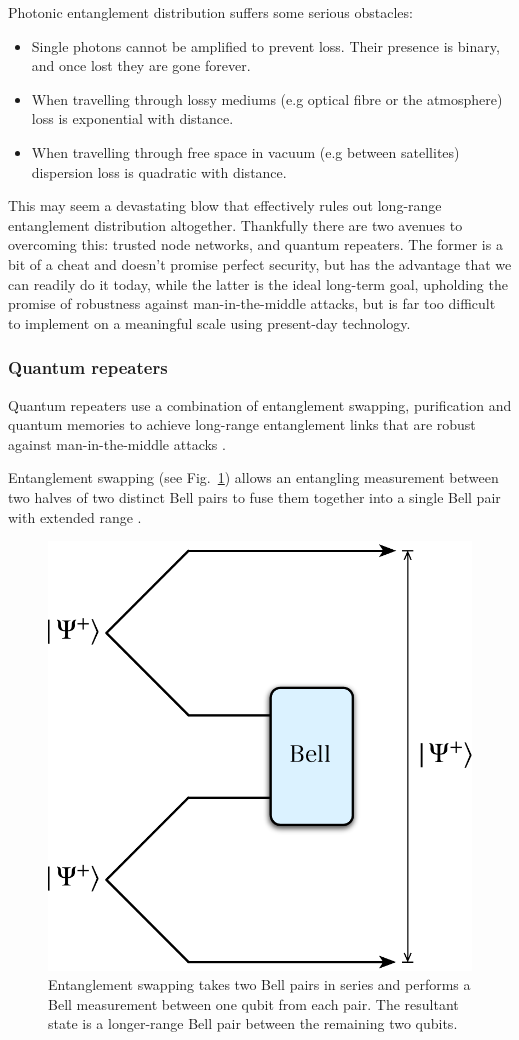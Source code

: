 Photonic entanglement distribution suffers some serious obstacles:
\begin{itemize}
	\item Single photons cannot be amplified to prevent loss. Their presence is binary, and once lost they are gone forever.
	\item When travelling through lossy mediums (e.g optical fibre or the atmosphere) loss is exponential with distance.
	\item When travelling through free space in vacuum (e.g between satellites) dispersion loss is quadratic with distance.
\end{itemize}
This may seem a devastating blow that effectively rules out long-range entanglement distribution altogether. Thankfully there are two avenues to overcoming this: trusted node networks, and quantum repeaters. The former is a bit of a cheat and doesn't promise perfect security, but has the advantage that we can readily do it today, while the latter is the ideal long-term goal, upholding the promise of robustness against man-in-the-middle attacks, but is far too difficult to implement on a meaningful scale using present-day technology.

\subsubsection{Quantum repeaters} \label{quantum-repeaters}

Quantum repeaters use a combination of entanglement swapping, purification and quantum memories to achieve long-range entanglement links that are robust against man-in-the-middle attacks \cite{bib:dur98}.

Entanglement swapping (see Fig.~\ref{fig:swapping}) allows an entangling measurement between two halves of two distinct Bell pairs to fuse them together into a single Bell pair with extended range \cite{bib:1993PhRvL.70.1895B}.

\begin{figure}[!htb]
	\centering
	\includegraphics[width=0.7\columnwidth]{figures/Entanglement_swapping}
	\caption{Entanglement swapping takes two Bell pairs in series and performs a Bell measurement between one qubit from each pair. The resultant state is a longer-range Bell pair between the remaining two qubits.} \label{fig:swapping}
\end{figure}

